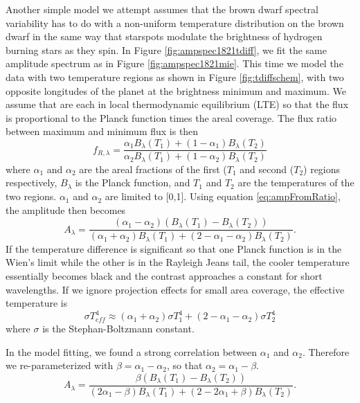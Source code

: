\documentclass[twocolumn]{aastex6}
\begin{document}
Another simple model we attempt assumes  that the brown dwarf spectral variability has to do with a non-uniform temperature distribution on the brown dwarf in the same way that starspots modulate the brightness of hydrogen burning stars as they spin.
In Figure \ref{fig:ampspec1821tdiff}, we fit the same amplitude spectrum as in Figure \ref{fig:ampspec1821mie}.
This time we model the data with two temperature regions as shown in Figure \ref{fig:tdiffschem}, with two opposite longitudes of the planet at the brightness minimum and maximum.
We assume that are each in local thermodynamic equilibrium (LTE) so that the flux is proportional to the Planck function times the areal coverage.
The flux ratio between maximum and minimum flux is then
\begin{equation}
f_{R,\lambda} = \frac{\alpha_1 B_\lambda(T_1) + (1-\alpha_1) B_\lambda(T_2)}{\alpha_2 B_\lambda(T_1) + (1-\alpha_2) B_\lambda(T_2)}
\end{equation}
where $\alpha_1$ and $\alpha_2$ are the areal fractions of the first ($T_1$ and second ($T_2$) regions respectively, $B_\lambda$ is the Planck function, and $T_1$ and $T_2$ are the temperatures of the two regions.
$\alpha_1$ and $\alpha_2$ are limited to [0,1].
Using equation \ref{eq:ampFromRatio}, the amplitude then becomes
\begin{equation}\label{eq:twoTempAmpAlphas}
A_\lambda = \frac{\left(\alpha_1 - \alpha_2 \right) \left(B_\lambda(T_1) - B_\lambda(T_2) \right)}{\left(\alpha_1 + \alpha_2\right) B_\lambda(T_1) + \left(2 - \alpha_1 - \alpha_2\right) B_\lambda(T_2)}.
\end{equation}
If the temperature difference is significant so that one Planck function is in the Wien's limit while the other is in the Rayleigh Jeans tail, the cooler temperature essentially becomes black and the contrast approaches a constant for short wavelengths.
If we ignore projection effects for small area coverage, the effective temperature is 
\begin{equation}
\sigma T_{eff}^4 \approx (\alpha_1 + \alpha_2) \sigma T_1^4 + (2 - \alpha_1 - \alpha_2) \sigma T_2^4
\end{equation}
where $\sigma$ is the Stephan-Boltzmann constant.

In the model fitting, we found a strong correlation between $\alpha_1$ and $\alpha_2$.
Therefore we re-parameterized with $\beta = \alpha_1 - \alpha_2$, so that $\alpha_2 = \alpha_1 - \beta$.
\begin{equation}\label{eq:twoTempAmp}
A_\lambda = \frac{\beta \left(B_\lambda(T_1) - B_\lambda(T_2) \right)}{\left(2 \alpha_1 - \beta \right) B_\lambda(T_1) + \left(2 - 2 \alpha_1 + \beta \right) B_\lambda(T_2)}.
\end{equation}
\end{document}
